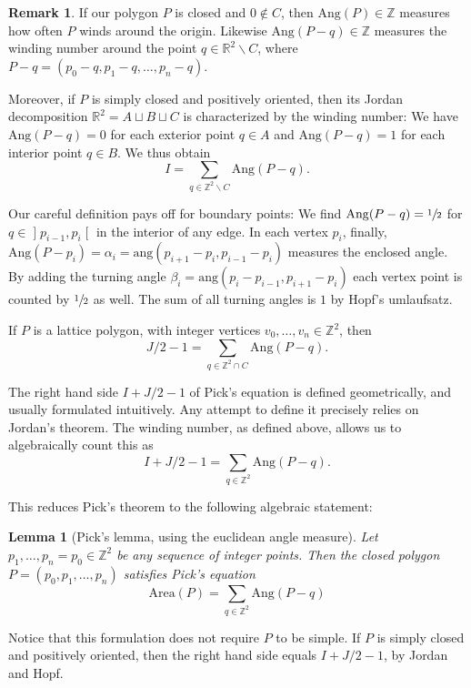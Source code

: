 \documentclass[a4paper]{amsart}
\numberwithin{equation}{section}
\theoremstyle{plain}
\newtheorem{lemma}[theorem]{Lemma}
\theoremstyle{definition}
\newtheorem{remark}[theorem]{Remark}
\newcommand{\Z}{\mathbb{Z}}
\newcommand{\R}{\mathbb{R}}
\newcommand{\ee}[2]{\mathopen] #1, #2 \mathclose[}
\newcommand{\minus}{\smallsetminus}
\newcommand{\Area}{\mathrm{Area}}
\newcommand{\ang}{\mathrm{ang}}
\newcommand{\Ang}{\mathrm{Ang}}
\newcommand{\Welp}{\mathrm{Welp}}
\begin{document}
\begin{remark}
  If our polygon $P$ is closed and $0 \notin C$, then $\Ang(P) \in \Z$
  measures how often $P$ winds around the origin.
  Likewise $\Ang(P-q) \in \Z$ measures the winding number
  around the point $q \in \R^2 \minus C$,
  where $P-q = (p_0-q,p_1-q,\ldots,p_n-q)$.

  Moreover, if $P$ is simply closed and positively oriented,
  then its Jordan decomposition $\R^2 = A \sqcup B \sqcup C$
  is characterized by the winding number:
  We have $\Ang(P-q) = 0$ for each exterior point $q \in A$
  and $\Ang(P-q) = 1$ for each interior point $q \in B$.
  We thus obtain
  \[
  I = \sum_{q \in \Z^2 \minus C} \Ang(P-q) .
  \]
  
  Our careful definition pays off for boundary points:
  We find $\Ang(P-q) = \sfrac{1}{2}$
  for $q \in \ee{p_{i-1}}{p_i}$ in the interior of any edge.
  In each vertex $p_i$, finally,
  $\Ang(P-p_i) = \alpha_i = \ang(p_{i+1}-p_i, p_{i-1}-p_i)$
  measures the enclosed angle. 
  By adding the turning angle $\beta_i = \ang(p_i-p_{i-1}, p_{i+1}-p_i)$
  each vertex point is counted by $\sfrac{1}{2}$ as well.
  The sum of all turning angles is $1$ by Hopf's umlaufsatz. %

  If $P$ is a lattice polygon, with integer vertices $v_0,\ldots,v_n \in \Z^2$, then
  \[
  J/2 - 1 = \sum_{q \in \Z^2 \cap C} \Ang(P-q) .
  \]
\end{remark}

The right hand side $I + J/2 - 1$ of Pick's equation
is defined geometrically, and usually formulated intuitively.
Any attempt to define it precisely relies on Jordan's theorem.
The winding number, as defined above, allows us to algebraically count
this as %
\[
I + J/2 - 1  = \sum_{q \in \Z^2} \Ang(P-q) .
\]

This reduces Pick's theorem to the following algebraic statement:

\begin{lemma}[Pick's lemma, using the euclidean angle measure] \label{lem:PickEuclidean}
  Let $p_1,\ldots,p_n=p_0 \in \Z^2$ be any sequence of integer points.
  Then the closed polygon $P = (p_0,p_1,\ldots,p_n)$ satisfies Pick's equation 
  \[
  \Area(P) = \sum_{q \in \Z^2} \Ang(P-q)
  \]
\end{lemma}

Notice that this formulation does not require $P$ to be simple.
If $P$ is simply closed and positively oriented, 
then the right hand side equals $I + J/2 - 1$,
by Jordan and Hopf.
\end{document}
